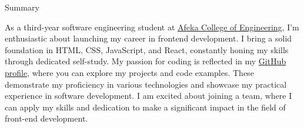 \documentclass{resume}
\begin{document}

 \begin{rSection}{Summary}

  As a third-year software engineering student at \href{https://www.afeka.ac.il/}{Afeka College of Engineering}, I'm enthusiastic about launching my
  career in frontend development. I bring a solid foundation in HTML, CSS, JavaScript, and React,
  constantly honing my skills through dedicated self-study.
  My passion for coding is reflected in my \href{https://github.com/Asnvir}{GitHub profile}, where you can explore my projects and
  code examples. These demonstrate my proficiency in various technologies and showcase my
  practical experience in software development.
  I am excited about joining a team, where I can apply my skills and dedication to make a significant
  impact in the field of front-end development.


 \end{rSection}




\end{document}
